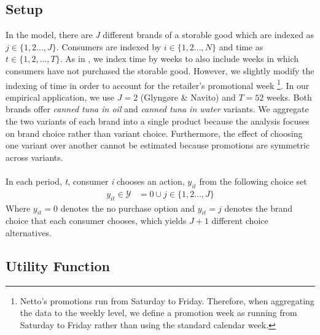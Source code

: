 \subsection{Setup}
In the model, there are \textit{J} different brands of a storable good which are indexed as $j \in \{1,2...,J\}$. Consumers are indexed by  $i \in \{1,2...,N\}$ and time as $t \in \{1,2,...,T\}$. As in \cite{Agu2023}, we index time by weeks to also include weeks in which consumers have not purchased the storable good. However, we slightly modify the indexing of time in order to account for the retailer's promotional week \footnote{Netto's promotions run from Saturday to Friday. Therefore, when aggregating the data to the weekly level, we define a promotion week as running from Saturday to Friday rather than using the standard calendar week.}. In our empirical application, we use $J = 2$ (Glyngøre \& Navito) and $T = 52$ weeks. Both brands offer \textit{canned tuna in oil} and \textit{canned tuna in water} variants. We aggregate the two variants of each brand into a single product because the analysis focuses on brand choice rather than variant choice. Furthermore, the effect of choosing one variant over another cannot be estimated because promotions are symmetric across variants. 
\\
\\
In each period, \textit{t}, consumer \textit{i} chooses an action, $y_{it}$ from the following choice set
\begin{align}
   y_{it} \in\mathcal{Y} &= 0  \cup j \in \{1,2...,J\}
\end{align}
Where $y_{it} = 0$ denotes the no purchase option and $y_{it} = j$ denotes the brand choice that each consumer chooses, which yields $J+1$ different choice alternatives. 


\subsection{Utility Function}

